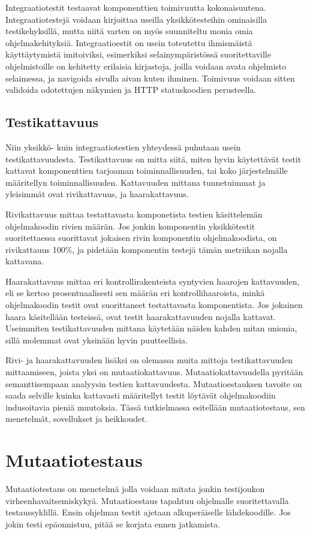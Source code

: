 \documentclass{tktltiki}
\begin{document}
Integraatiotestit testaavat komponenttien toimivuutta kokonaisuutena. Integraatiotestejä voidaan kirjoittaa useilla yksikkötesteihin ominaisilla testikehyksillä, mutta niitä varten on myös suunniteltu monia omia ohjelmakehityksiä. Integraatioestit on usein toteutettu ihmismäistä käyttäytymistä imitoiviksi, esimerkiksi selainympäristössä suoritettaville ohjelmistoille on kehitetty erilaisia kirjastoja, joilla voidaan avata ohjelmisto selaimessa, ja navigoida sivulla aivan kuten ihminen. Toimivuus voidaan sitten validoida odotettujen näkymien ja HTTP statuskoodien perusteella.

\subsection{Testikattavuus}
Niin yksikkö- kuin integraatiotestien yhteydessä puhutaan usein testikattavuudesta. Testikattavuus on mitta siitä, miten hyvin käytettävät testit kattavat komponenttien tarjoaman toiminnallisuuden, tai koko järjestelmälle määritellyn toiminnallisuuden. Kattavuuden mittana tunnetuimmat ja yleisimmät ovat rivikattavuus, ja haarakattavuus.

Rivikattavuus mittaa testattavasta komponetista testien käsittelemän ohjelmakoodin rivien määrän. Jos jonkin komponentin yksikkötestit suoritettaessa suorittavat jokaisen rivin komponentin ohjelmakoodista, on rivikattauus 100\%, ja pidetään komponentin testejä tämän metriikan nojalla kattavana.

Haarakattavuus mittaa eri kontrollirakenteista syntyvien haarojen kattavuuden, eli se kertoo prosentuaalisesti sen määrän eri kontrollihaaroista, minkä ohjelmakoodin testit ovat suorittaneet testattavasta komponentista. Jos jokainen haara käsitellään testeissä, ovat testit haarakattavuuden nojalla kattavat. Useimmiten testikattavuuden mittana käytetään näiden kahden mitan unionia, sillä molemmat ovat yksinään hyvin puutteellisia.

Rivi- ja haarakattavuuden lisäksi on olemassa muita mittoja testikattavuuden mittaamiseen, joista yksi on mutaatiokattavuus. Mutaatiokattavuudella pyritään semanttisempaan analyysin testien kattavuudesta. Mutaatioestauksen tavoite on saada selville kuinka kattavasti määritellyt testit löytävät ohjelmakoodiin indusoitavia pieniä muutoksia. Tässä tutkielmassa esitellään mutaatiotestaus, sen menetelmät, sovellukset ja heikkoudet.

\section{Mutaatiotestaus}
Mutaatiotestaus on menetelmä jolla voidaan mitata jonkin testijoukon virheenhavaitsemiskykyä. Mutaatioestaus tapahtuu ohjelmalle suoritettavalla testaussyklillä. Ensin ohjelman testit ajetaan alkuperäiselle lähdekoodille. Jos jokin testi epäonnistuu, pitää se korjata ennen jatkamista.
\end{document}
